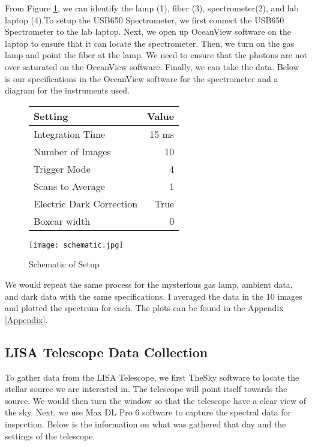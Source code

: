 \documentclass[10pt, preprint]{aastex}
\begin{document}
From Figure \ref{fig:schematic}, we can identify the lamp (1), fiber (3), spectrometer(2), and lab laptop (4).To setup the USB650 Spectrometer, we first connect the USB650 Spectrometer to the lab laptop. Next, we open up OceanView software on the laptop to ensure that it can locate the spectrometer. Then, we turn on the gas lamp and point the fiber at the lamp. We need to ensure that the photons are not over saturated on the OceanView software. Finally, we can take the data. Below is our specifications in the OceanView software for the spectrometer and a diagram for the instruments used. 

\begin{figure}[H]
\centering
\begin{minipage}{0.48\textwidth}
    \centering
    \begin{tabular}{lr}
        \hline
        Setting & Value \\
        \hline
        Integration Time & 15 ms \\
        Number of Images & 10 \\
        Trigger Mode & 4 \\
        Scans to Average & 1 \\
        Electric Dark Correction & True \\
        Boxcar width & 0 \\
    \end{tabular}
\end{minipage}%
\hspace{0.02\textwidth}
\begin{minipage}{0.48\textwidth}
    \centering
    \texttt{[image: schematic.jpg]}
    \caption{\label{fig:schematic}Schematic of Setup}
\end{minipage}
\end{figure}

We would repeat the same process for the mysterious gas lamp, ambient data, and dark data with the same specifications. I averaged the data in the 10 images and plotted the spectrum for each. The plots can be found in the Appendix \ref{Appendix}.


\subsection{LISA Telescope Data Collection}

To gather data from the LISA Telescope, we first TheSky software to locate the stellar source we are interested in. The telescope will point itself towards the source. We would then turn the window so that the telescope have a clear view of the sky. Next, we use Max DL Pro 6 software to capture the spectral data for inspection. Below is the information on what was gathered that day and the settings of the telescope. 
\end{document}
